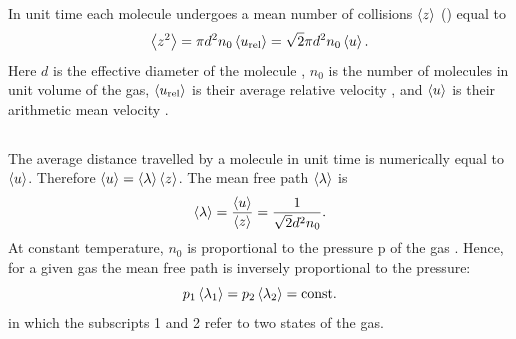 \subsection{}\label{10.5.2} In unit time each molecule undergoes a mean number of collisions $\expval{z}$ () equal to
\begin{equation*}%
\expval{z^{2}} = \pi d^{2} n_{0} \expval{u_{\text{rel}}} = \sqrt{2} \pi d^{2} n_{0} \expval{u}.
\end{equation*}
Here $d$ is the effective diameter of the molecule , $n_{0}$ is the number of molecules in unit volume of the gas, $\expval{u_{\text{rel}}}$ is their average relative velocity , and $\expval{u}$ is their arithmetic mean velocity .

\subsection{}\label{10.5.3} The average distance travelled by a molecule in unit time is numerically equal to $\expval{u}$. Therefore $\expval{u} = \expval{\lambda}\expval{z}$. The mean free path $\expval{\lambda}$ is
\begin{equation*}%
\expval{\lambda} = \frac{\expval{u}}{\expval{z}} = \frac{1}{\sqrt{2} d^{2}n_{0}}.
\end{equation*}
At constant temperature, $n_{0}$ is proportional to the pressure p of the gas . Hence, for a given gas the mean free path is inversely proportional to the pressure:
\begin{equation*}%
p_{1} \expval{\lambda_{1}}  = p_{2} \expval{\lambda_{2}} = \text{const}.
\end{equation*}%
in which the subscripts 1 and 2 refer to two states of the gas. 

